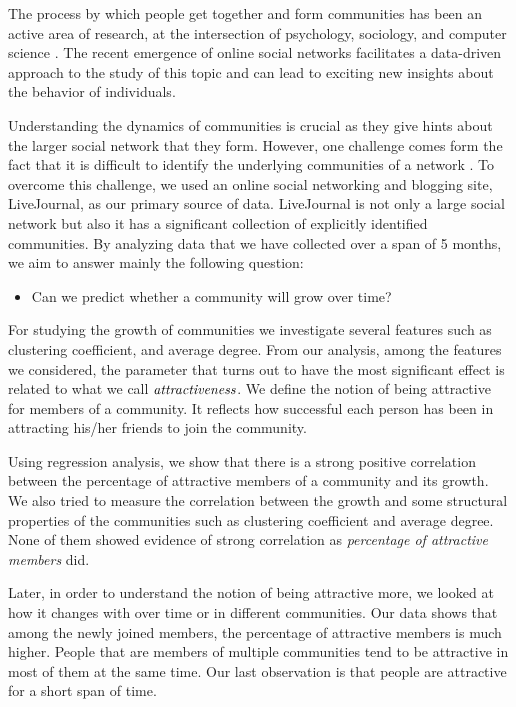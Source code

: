 The process by which people get together and form communities has been an active area of research, at the intersection of psychology, sociology, and computer science \cite{social_ref}. The recent emergence of online social networks facilitates a data-driven approach to the study of this topic and can lead to exciting new insights about the behavior of individuals. 

Understanding the dynamics of communities is crucial as they give hints about the larger 
social network that they form. However, one challenge comes form the fact that it is difficult to
identify the underlying communities of a network \cite{newman, danon, www10}.  To overcome this challenge, 
we used an online social networking and blogging site, LiveJournal, as our primary source of data.
LiveJournal is not only a large social network but also it has a significant collection of explicitly
identified communities. By analyzing data that we have collected over a span of 5 months, we aim to answer mainly the following question:

\begin{itemize}
\item Can we predict whether a community will grow over time?
\end{itemize}

For studying the growth of communities we investigate several features such as clustering coefficient, and average degree. From our analysis, among the features we considered, the parameter that turns out to have the most significant effect is related to what we call $\emph{attractiveness}$. We define the notion of being attractive for members of a community. It reflects how successful each person has been in attracting his/her friends to join the community.

Using regression analysis, we show that there is a strong positive correlation between the percentage of attractive members of a community and its growth. We also tried to measure the correlation between the growth and some structural properties of the communities such as clustering coefficient and average degree. None of them showed evidence of strong correlation as \emph{percentage of attractive members} did. 

Later, in order to understand the notion of being attractive more, we looked at how it changes with over time or in different communities. Our data shows that among the newly joined members, the percentage of attractive members is much higher. People that are members of multiple communities tend to be attractive in most of them at the same time. Our last observation is that people are attractive for a short span of time.

